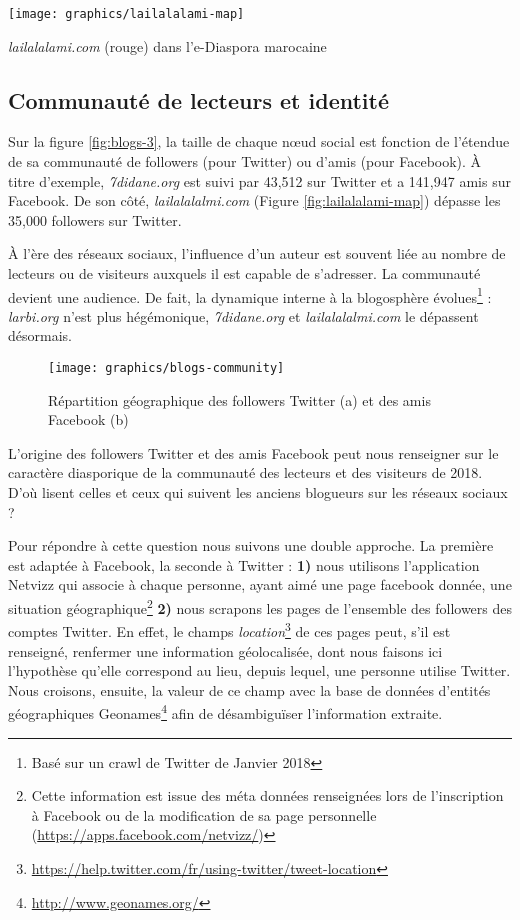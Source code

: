 \documentclass[symmetric,justified,marginals=raggedouter]{tufte-book}
\begin{document}
\begin{marginfigure}%
  \texttt{[image: graphics/lailalalami-map]}
  \vspace*{0.2cm}  
  \caption{\textit{lailalalami.com} (rouge) dans l'e-Diaspora marocaine}
  \label{fig:lailalalami-map}
\end{marginfigure} 

\subsection{Communauté de lecteurs et identité}

\noindent Sur la figure \ref{fig:blogs-3}, la taille de chaque nœud social est fonction de l'étendue de sa communauté de followers (pour Twitter) ou d'amis (pour Facebook). À titre d'exemple, \textit{7didane.org} est suivi par 43,512 sur Twitter et a 141,947 amis sur Facebook. De son côté, \textit{lailalalalmi.com} (Figure \ref{fig:lailalalami-map}) dépasse les 35,000 followers sur Twitter.

À l'ère des réseaux sociaux, l'influence d'un auteur est souvent liée au nombre de lecteurs ou de visiteurs auxquels il est capable de s'adresser. La communauté devient une audience. De fait, la dynamique interne à la blogosphère évolues\footnote{Basé sur un crawl de Twitter de Janvier 2018} : \textit{larbi.org} n'est plus hégémonique, \textit{7didane.org} et \textit{lailalalalmi.com} le dépassent désormais.

\begin{figure*}
  \texttt{[image: graphics/blogs-community]}
  \caption{Répartition géographique des followers Twitter (a) et des amis Facebook (b)}
  \label{fig:blogs-community}
\end{figure*} 

\noindent L'origine des followers Twitter et des amis Facebook peut nous renseigner sur le caractère diasporique de la communauté des lecteurs et des visiteurs de 2018. D'où lisent celles et ceux qui suivent les anciens blogueurs sur les réseaux sociaux ?

\noindent Pour répondre à cette question nous suivons une double approche. La première est adaptée à Facebook, la seconde à Twitter : \textbf{1)} nous utilisons l'application Netvizz qui associe à chaque personne, ayant aimé une page facebook donnée, une situation géographique\footnote{Cette information est issue des méta données renseignées lors de l'inscription à Facebook ou de la modification de sa page personnelle (\url{https://apps.facebook.com/netvizz/})} \textbf{2)} nous scrapons les pages de l'ensemble des followers des comptes Twitter. En effet, le champs \textit{location}\footnote{\url{https://help.twitter.com/fr/using-twitter/tweet-location}} de ces pages peut, s'il est renseigné, renfermer une information géolocalisée, dont nous faisons ici l'hypothèse qu'elle correspond au lieu, depuis lequel, une personne utilise Twitter. Nous croisons, ensuite, la valeur de ce champ avec la base de données d'entités géographiques Geonames\footnote{\url{http://www.geonames.org/}} afin de désambiguïser l'information extraite. 
\end{document}
